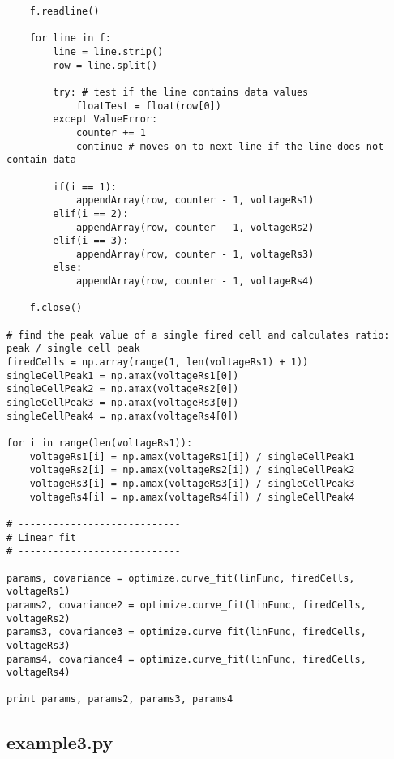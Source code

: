 \begin{lstlisting}
    f.readline()

    for line in f:
        line = line.strip()
        row = line.split()

        try: # test if the line contains data values
            floatTest = float(row[0])
        except ValueError:
            counter += 1
            continue # moves on to next line if the line does not contain data

        if(i == 1):
            appendArray(row, counter - 1, voltageRs1)
        elif(i == 2):
            appendArray(row, counter - 1, voltageRs2)
        elif(i == 3):
            appendArray(row, counter - 1, voltageRs3)
        else:
            appendArray(row, counter - 1, voltageRs4)

    f.close()

# find the peak value of a single fired cell and calculates ratio: peak / single cell peak
firedCells = np.array(range(1, len(voltageRs1) + 1))
singleCellPeak1 = np.amax(voltageRs1[0])
singleCellPeak2 = np.amax(voltageRs2[0])
singleCellPeak3 = np.amax(voltageRs3[0])
singleCellPeak4 = np.amax(voltageRs4[0])

for i in range(len(voltageRs1)):
    voltageRs1[i] = np.amax(voltageRs1[i]) / singleCellPeak1
    voltageRs2[i] = np.amax(voltageRs2[i]) / singleCellPeak2
    voltageRs3[i] = np.amax(voltageRs3[i]) / singleCellPeak3
    voltageRs4[i] = np.amax(voltageRs4[i]) / singleCellPeak4

# ----------------------------
# Linear fit
# ----------------------------

params, covariance = optimize.curve_fit(linFunc, firedCells, voltageRs1)
params2, covariance2 = optimize.curve_fit(linFunc, firedCells, voltageRs2)
params3, covariance3 = optimize.curve_fit(linFunc, firedCells, voltageRs3)
params4, covariance4 = optimize.curve_fit(linFunc, firedCells, voltageRs4)

print params, params2, params3, params4

\end{lstlisting}

\subsection{example3.py}

